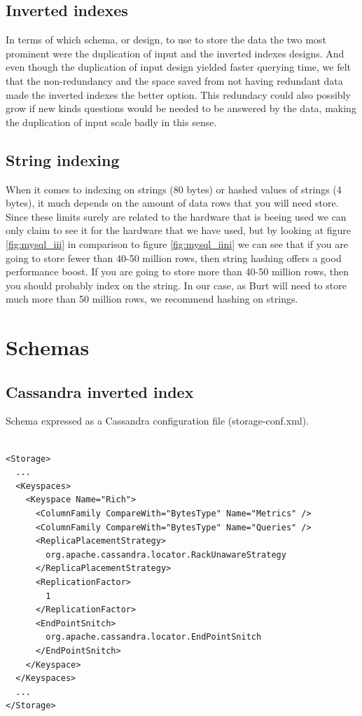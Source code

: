\section{Inverted indexes}
In terms of which schema, or design, to use to store the data the two most prominent were the duplication of input and the inverted indexes designs. And even though the duplication of input design yielded faster querying time, we felt that the non-redundancy and the space saved from not having redundant data made the inverted indexes the better option. This redundacy could also possibly grow if new kinds questions would be needed to be answered by the data, making the duplication of input scale badly in this sense.

\section{String indexing}
When it comes to indexing on strings (80 bytes) or hashed values of strings (4 bytes), it much depends on the amount of data rows that you will need store. Since these limits surely are related to the hardware that is beeing used we can only claim to see it for the hardware that we have used, but by looking at figure \ref{fig:mysql_iii} in comparison to figure \ref{fig:mysql_iini} we can see that if you are going to store fewer than 40-50 million rows, then string hashing offers a good performance boost. If you are going to store more than 40-50 million rows, then you should probably index on the string. In our case, as Burt will need to store much more than 50 million rows, we recommend hashing on strings.

\pagebreak

 

\appendix

\pagebreak

\chapter{Schemas}

\section{Cassandra inverted index}

Schema expressed as a Cassandra configuration file (storage-conf.xml).

\begin{verbatim}

<Storage>
  ...
  <Keyspaces>
    <Keyspace Name="Rich">
      <ColumnFamily CompareWith="BytesType" Name="Metrics" />
      <ColumnFamily CompareWith="BytesType" Name="Queries" />
      <ReplicaPlacementStrategy>
        org.apache.cassandra.locator.RackUnawareStrategy
      </ReplicaPlacementStrategy>
      <ReplicationFactor>
        1
      </ReplicationFactor>
      <EndPointSnitch>
        org.apache.cassandra.locator.EndPointSnitch
      </EndPointSnitch>
    </Keyspace>
  </Keyspaces>
  ...
</Storage>


\end{verbatim}

